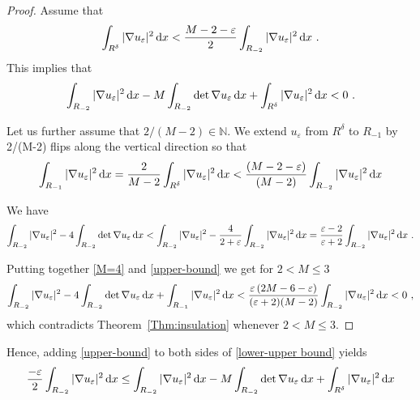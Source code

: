 \documentclass[12pt]{amsart}
\newcommand{\md}{{\rm d}}
\newcommand{\1}{{\bf 1}}
\begin{document}
\begin{proof}
    
Assume that 
\begin{align}
  \int_{R^\delta}|\nabla u_\varepsilon|^2 \,\md x  < \frac{M-2-\varepsilon}{2} \int_{R_{-2}}|\nabla u_\varepsilon|^2 \,\md x\ .
\end{align}
This implies that 
\begin{align}
   \int_{R_{-2}}|\nabla u_\varepsilon|^2 \,\md x -M\int_{R_{-2}}\det\nabla u_\varepsilon\,\md x+ \int_{R^\delta}|\nabla u_\varepsilon|^2 \,\md x<0\ .
\end{align}

Let us further assume that $2/(M-2)\in\mathbb{N}$.
 We extend $u_\varepsilon$ from $R^\delta$ to $R_{-1}$ by 2/(M-2)  flips along the vertical direction   so that 
 \begin{align}\label{upper-bound}
     \int_{R_{-1}}|\nabla u_\varepsilon|^2 \,\md x=\frac{2}{M-2} \int_{R^\delta}|\nabla u_\varepsilon|^2 \,\md x<
     \frac{(M-2-\varepsilon)}{(M-2)}\int_{R_{-2}}|\nabla u_\varepsilon|^2 \,\md x
 \end{align}

 We have 
 \begin{align}\label{M=4}
    \int_{R_{-2}}|\nabla u_\varepsilon|^2 -4\int_{R_{-2}}\det\nabla u_\varepsilon\,\md x <  \int_{R_{-2}}|\nabla u_\varepsilon|^2 -\frac{4}{2+\varepsilon} \int_{R_{-2}}|\nabla u_\varepsilon|^2\, \md x=\frac{\varepsilon-2}{\varepsilon+2}\int_{R_{-2}}|\nabla u_\varepsilon|^2\, \md x\ .
 \end{align}

 Putting together \eqref{M=4} and \eqref{upper-bound}
we get for $2<M\le 3$
\begin{align}
  \int_{R_{-2}}|\nabla u_\varepsilon|^2 -4\int_{R_{-2}}\det\nabla u_\varepsilon\,\md x+ \int_{R_{-1}}|\nabla u_\varepsilon|^2 \,\md x< \frac{\varepsilon\,(2M-6-\varepsilon)}{(\varepsilon+2)(M-2)}\int_{R_{-2}}|\nabla u_\varepsilon|^2\, \md x <0\ ,
\end{align}
 which contradicts Theorem~\ref{Thm:insulation} whenever $2<M\le 3$. 

 \end{proof}
Hence, adding \eqref{upper-bound} to both sides of \eqref{lower-upper bound} yields 
\begin{align*}
   \frac{-\varepsilon}{2}\int_{R_{-2}}|\nabla u_\varepsilon|^2 \,\md x&\le \int_{R_{-2}}|\nabla u_\varepsilon|^2 \,\md x -M\int_{R_{-2}}\det\nabla u_\varepsilon\,\md x+\int_{R^\delta}|\nabla u_\varepsilon|^2 \,\md x \\
\end{align*} 
\end{document}
